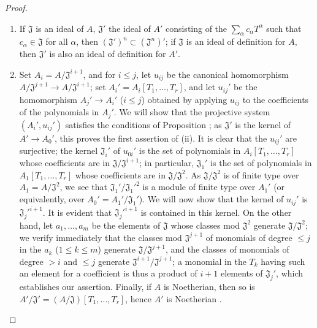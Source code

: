 \begin{proof}
\medskip\noindent
\begin{enumerate}
  \item[(i)] If $\mathfrak{J}$ is an ideal of $A$, $\mathfrak{J}'$ the ideal of $A'$
    consisting of the $\sum_\alpha c_\alpha T^\alpha$ such that $c_\alpha\in\mathfrak{J}$
    for all $\alpha$, then $(\mathfrak{J}')^n\subset(\mathfrak{J}^n)'$; if $\mathfrak{J}$
    is an ideal of definition for $A$, then $\mathfrak{J}'$ is also an ideal of definition
    for $A'$.
  \item[(ii)] Set $A_i=A/\mathfrak{J}^{i+1}$, and for $i\leq j$, let $u_{ij}$ be the
    canonical homomorphism $A/\mathfrak{J}^{j+1}\to A/\mathfrak{J}^{i+1}$; set
    $A_i'=A_i[T_1,\dots,T_r]$, and let $u_{ij}'$ be the homomorphism $A_j'\to A_i'$
    ($i\leq j$) obtained by applying $u_{ij}$ to the coefficients of the polynomials
    in $A_j'$. We will show that the projective system $(A_i',u_{ij}')$ satisfies the conditions
    of Proposition ; as $\mathfrak{J}'$ is the kernel of
    $A'\to A_0'$, this proves the first assertion of (ii). It is clear that the $u_{ij}'$ are
    surjective; the kernel $\mathfrak{J}_i'$ of $u_{0i}'$ is the set of polynomials in
    $A_i[T_1,\dots,T_r]$ whose coefficients are in $\mathfrak{J}/\mathfrak{J}^{i+1}$; in
    particular, $\mathfrak{J}_1'$ is the set of polynomials in $A_1[T_1,\dots,T_r]$ whose
    coefficients are in $\mathfrak{J}/\mathfrak{J}^2$. As $\mathfrak{J}/\mathfrak{J}^2$ is
    of finite type over $A_1=A/\mathfrak{J}^2$, we see that $\mathfrak{J}_1'/{\mathfrak{J}_1'}^2$
    is a module of finite type over $A_1'$ (or equivalently, over $A_0'=A_1'/\mathfrak{J}_1'$).
    We will now show that the kernel of $u_{ij}'$ is ${\mathfrak{J}_j'}^{i+1}$. It is evident that
    ${\mathfrak{J}_j'}^{i+1}$ is contained in this kernel. On the other hand, let $a_1,\dots,a_m$
    be the elements of $\mathfrak{J}$ whose classes mod $\mathfrak{J}^2$ generate
    $\mathfrak{J}/\mathfrak{J}^2$; we verify immediately that the classes mod $\mathfrak{J}^{j+1}$
    of monomials of degree $\leq j$ in the $a_k$ ($1\leq k\leq m$) generate
    $\mathfrak{J}/\mathfrak{J}^{j+1}$, and the classes of monomials of degree $>i$ and
    $\leq j$ generate $\mathfrak{J}^{i+1}/\mathfrak{J}^{j+1}$; a monomial in the $T_k$
    having such an element for a coefficient is thus a product of $i+1$ elements of
    $\mathfrak{J}_j'$, which establishes our assertion. Finally, if $A$ is Noetherian, then so
    is $A'/\mathfrak{J}'=(A/\mathfrak{J})[T_1,\dots,T_r]$, hence $A'$ is Noetherian .
\end{enumerate}
\end{proof}

